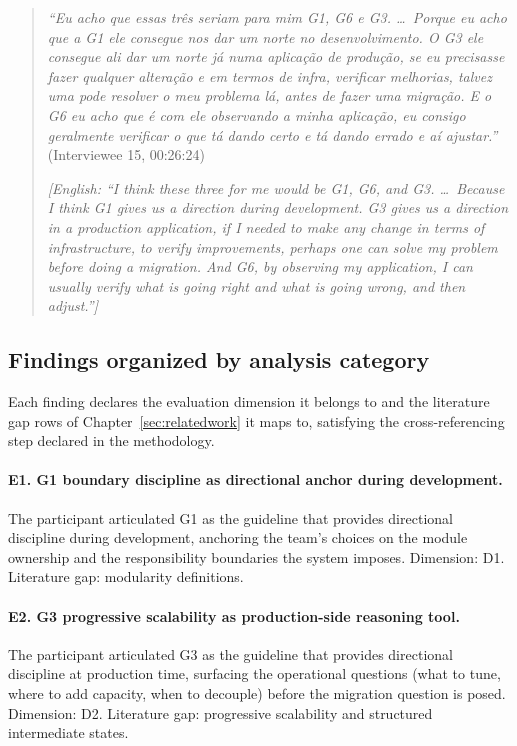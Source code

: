 \begin{quote}
\emph{``Eu acho que essas tr\^es seriam para mim G1, G6 e G3. \ldots\ Porque eu acho que a G1 ele consegue nos dar um norte no desenvolvimento. O G3 ele consegue ali dar um norte j\'a numa aplica\c{c}\~ao de produ\c{c}\~ao, se eu precisasse fazer qualquer altera\c{c}\~ao e em termos de infra, verificar melhorias, talvez uma pode resolver o meu problema l\'a, antes de fazer uma migra\c{c}\~ao. E o G6 eu acho que \'e com ele observando a minha aplica\c{c}\~ao, eu consigo geralmente verificar o que t\'a dando certo e tá dando errado e a\'i ajustar.''} (Interviewee 15, 00:26:24)

\emph{[English: ``I think these three for me would be G1, G6, and G3. \ldots\ Because I think G1 gives us a direction during development. G3 gives us a direction in a production application, if I needed to make any change in terms of infrastructure, to verify improvements, perhaps one can solve my problem before doing a migration. And G6, by observing my application, I can usually verify what is going right and what is going wrong, and then adjust.'']}
\end{quote}

\subsection*{Findings organized by analysis category}

Each finding declares the evaluation dimension it belongs to and the literature gap rows of Chapter~\ref{sec:relatedwork} it maps to, satisfying the cross-referencing step declared in the methodology.

\paragraph*{E1. G1 boundary discipline as directional anchor during development.} The participant articulated G1 as the guideline that provides directional discipline during development, anchoring the team's choices on the module ownership and the responsibility boundaries the system imposes. Dimension: D1. Literature gap: modularity definitions.

\paragraph*{E2. G3 progressive scalability as production-side reasoning tool.} The participant articulated G3 as the guideline that provides directional discipline at production time, surfacing the operational questions (what to tune, where to add capacity, when to decouple) before the migration question is posed. Dimension: D2. Literature gap: progressive scalability and structured intermediate states.

